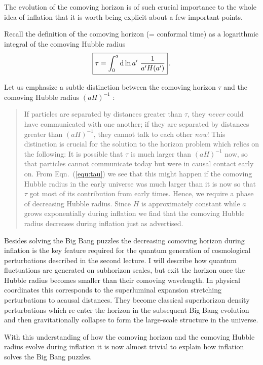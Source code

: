 \documentclass[12pt,letterpaper,rotate]{article}
\def\beq{\begin{equation}}
\def\eeq{\end{equation}}
\def\d{{\rm d}}
\begin{document}
{The evolution of the comoving horizon is of such crucial importance to the whole idea of inflation that it is worth being explicit about a few important points.

Recall the definition of the comoving horizon (= conformal time) as a logarithmic integral of the comoving Hubble radius
\beq
\label{equ:tau}
\fbox{$\displaystyle
\tau = \int_0^a \d \ln a' \ \frac{1}{a' H(a')} $}\, .
\eeq

Let us emphasize a subtle distinction between the comoving horizon $\tau$ and the comoving Hubble radius $(aH)^{-1}$ \cite{Dodelson}: 
\begin{quote}
If particles are separated by distances greater than $\tau$, they {\it never} could have communicated with one another; if they are separated by distances greater than $(aH)^{-1}$, they cannot talk to each other {\it now}! This distinction is crucial for the solution to the horizon problem which relies on the following: It is possible that $\tau$ is much larger than $(aH)^{-1}$ now, so that particles cannot communicate today but were in causal contact early on. From Eqn.~(\ref{equ:tau}) we see that this might happen if the comoving Hubble radius in the early universe was much larger than it is now so that $\tau$ got most of its contribution from early times. Hence, we require a phase of decreasing Hubble radius.
Since $H$ is approximately constant while $a$ grows exponentially during inflation we find that the comoving Hubble radius decreases during inflation just as advertised.
\end{quote}

Besides solving the Big Bang puzzles the decreasing comoving horizon during inflation is the key feature required for the quantum generation of cosmological perturbations described in the second lecture. I will describe how quantum fluctuations are generated on subhorizon scales, but exit the horizon once the Hubble radius becomes smaller than their comoving wavelength. In physical coordinates this corresponds to the superluminal expansion stretching perturbations to acausal distances. They become classical superhorizon density perturbations which re-enter the horizon in the subsequent Big Bang evolution and then gravitationally collapse to form the large-scale structure in the universe. 

With this understanding of how the comoving horizon and the comoving Hubble radius evolve during inflation it is now almost trivial to explain how inflation solves the Big Bang puzzles.

}
\end{document}

